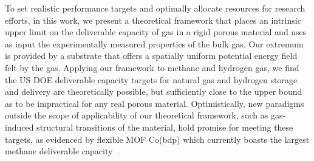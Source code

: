 To set realistic performance targets and optimally allocate resources for research efforts, in this work, we present a theoretical framework that places an intrinsic upper limit on the deliverable capacity of gas in a rigid porous material and uses as input the experimentally measured properties of the bulk gas. Our extremum is provided by a substrate that offers a spatially uniform potential energy field felt by the gas. Applying our framework to methane and hydrogen gas, we find the US DOE deliverable capacity targets for natural gas and hydrogen storage and delivery are theoretically possible, but sufficiently close to the upper bound as to be impractical for any real porous material. Optimistically, new paradigms outside the scope of applicability of our theoretical framework, such as gas-induced structural transitions of the material, hold promise for meeting these targets, as evidenced by flexible MOF Co(bdp) which currently boasts the largest methane deliverable capacity~\cite{mason2015methane}.


